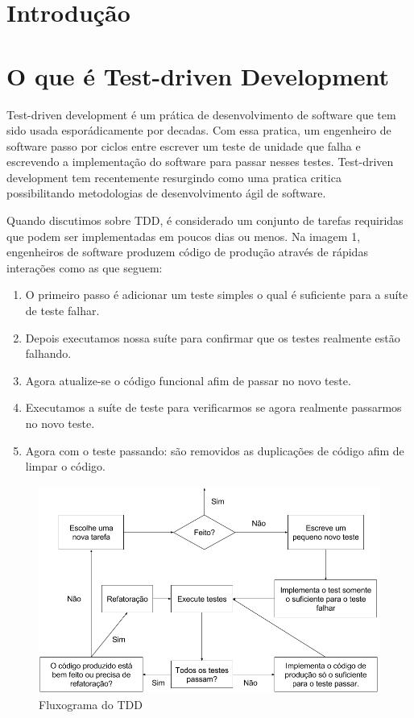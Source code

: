 \documentclass{article}
\begin{document}
  \clearpage

  \section{Introdução}

  \section{O que é Test-driven Development}

  Test-driven development é um prática de desenvolvimento de software que tem 
  sido usada esporádicamente por decadas. Com essa pratica, um engenheiro de 
  software passo por ciclos entre escrever um teste de unidade que falha e 
  escrevendo a implementação do software para passar nesses testes. 
  Test-driven development tem recentemente resurgindo como uma pratica critica 
  possibilitando metodologias de desenvolvimento ágil de software.

  Quando discutimos sobre TDD, é considerado um conjunto de tarefas requiridas 
  que podem ser implementadas em poucos dias ou menos. Na imagem 1, engenheiros 
  de software produzem código de produção através de rápidas interações como as 
  que seguem:

  \begin{enumerate}
    \item O primeiro passo é adicionar um teste simples o qual é suficiente 
    para a suíte de teste falhar.
    \item Depois executamos nossa suíte para confirmar que os testes realmente 
    estão falhando.
    \item Agora atualize-se o código funcional afim de passar no novo teste.
    \item Executamos a suíte de teste para verificarmos se agora realmente 
    passarmos no novo teste.
    \item Agora com o teste passando: são removidos as duplicações de código 
    afim de limpar o código.
  \end{enumerate}

  \begin{figure}[H]
    \centering
    \includegraphics[scale=0.4]{tdd}
    \caption{Fluxograma do TDD}
  \end{figure}
\end{document}
